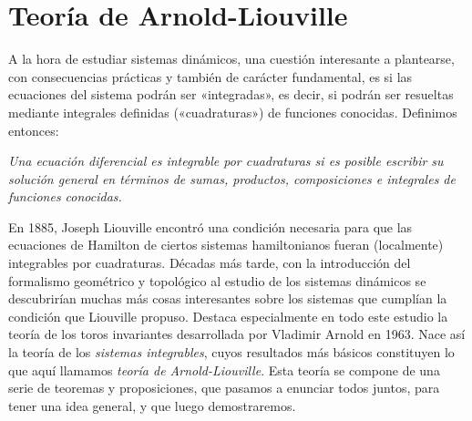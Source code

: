 \section{Teoría de Arnold-Liouville}\label{sec:arnoldliouville}
A la hora de estudiar sistemas dinámicos, una cuestión interesante a plantearse, con consecuencias prácticas y también de carácter fundamental, es si las ecuaciones del sistema podrán ser «integradas», es decir, si podrán ser resueltas mediante integrales definidas («cuadraturas») de funciones conocidas. Definimos entonces:
\begin{defn}
  \em
  Una ecuación diferencial es \emph{integrable por cuadraturas} si es posible escribir su solución general en términos de sumas, productos, composiciones e integrales de funciones conocidas. 
\end{defn}

En 1885, Joseph Liouville encontró una condición necesaria para que las ecuaciones de Hamilton de ciertos sistemas hamiltonianos fueran (localmente) integrables por cuadraturas. Décadas más tarde, con la introducción del formalismo geométrico y topológico al estudio de los sistemas dinámicos se descubrirían muchas más cosas interesantes sobre los sistemas que cumplían la condición que Liouville propuso. Destaca especialmente en todo este estudio la teoría de los toros invariantes desarrollada por Vladimir Arnold en 1963. Nace así la teoría de los \emph{sistemas integrables}, cuyos resultados más básicos constituyen lo que aquí llamamos \emph{teoría de Arnold-Liouville}. Esta teoría se compone de una serie de teoremas y proposiciones, que pasamos a enunciar todos juntos, para tener una idea general, y que luego demostraremos.

